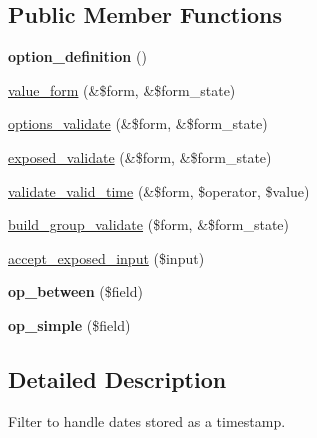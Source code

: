 \subsection*{Public Member Functions}
\begin{DoxyCompactItemize}
\item 
\hypertarget{classviews__handler__filter__date_a5fdeb678009a8c8c23395826caee3062}{
{\bfseries option\_\-definition} ()}
\label{classviews__handler__filter__date_a5fdeb678009a8c8c23395826caee3062}

\item 
\hyperlink{classviews__handler__filter__date_a5c7fb298feef092a2cb3bc3f75f54f29}{value\_\-form} (\&\$form, \&\$form\_\-state)
\item 
\hyperlink{classviews__handler__filter__date_a6d4e05f04a0f9ea5663f165777f54003}{options\_\-validate} (\&\$form, \&\$form\_\-state)
\item 
\hyperlink{classviews__handler__filter__date_a0146f5fd6dee328506fc6f29006eb401}{exposed\_\-validate} (\&\$form, \&\$form\_\-state)
\item 
\hyperlink{classviews__handler__filter__date_ad19ed65f3335ed1ac6896fe17a480b4e}{validate\_\-valid\_\-time} (\&\$form, \$operator, \$value)
\item 
\hyperlink{classviews__handler__filter__date_aa5ba23cd2f32402635c1fca175cfaa01}{build\_\-group\_\-validate} (\$form, \&\$form\_\-state)
\item 
\hyperlink{classviews__handler__filter__date_a063da758bf1832f38454620cbc94e304}{accept\_\-exposed\_\-input} (\$input)
\item 
\hypertarget{classviews__handler__filter__date_ab097983da22dfe68e579d92147189a9c}{
{\bfseries op\_\-between} (\$field)}
\label{classviews__handler__filter__date_ab097983da22dfe68e579d92147189a9c}

\item 
\hypertarget{classviews__handler__filter__date_a3da46dbfd7a36f8b8ac327de68674c71}{
{\bfseries op\_\-simple} (\$field)}
\label{classviews__handler__filter__date_a3da46dbfd7a36f8b8ac327de68674c71}

\end{DoxyCompactItemize}


\subsection{Detailed Description}
Filter to handle dates stored as a timestamp. 

